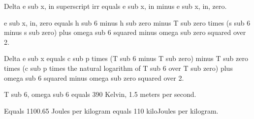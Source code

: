 Delta e sub x, in superscript irr equals e sub x, in minus e sub x, in, zero.

e sub x, in, zero equals h sub 6 minus h sub zero minus T sub zero times (s sub 6 minus s sub zero) plus omega sub 6 squared minus omega sub zero squared over 2.

Delta e sub x equals c sub p times (T sub 6 minus T sub zero) minus T sub zero times (c sub p times the natural logarithm of T sub 6 over T sub zero) plus omega sub 6 squared minus omega sub zero squared over 2.

T sub 6, omega sub 6 equals 390 Kelvin, 1.5 meters per second.

Equals 1100.65 Joules per kilogram equals 110 kiloJoules per kilogram.